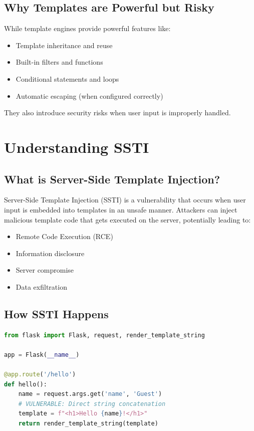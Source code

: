 \documentclass{article}
\begin{document}
\subsection{Why Templates are Powerful but Risky}
While template engines provide powerful features like:
\begin{itemize}
    \item Template inheritance and reuse
    \item Built-in filters and functions
    \item Conditional statements and loops
    \item Automatic escaping (when configured correctly)
\end{itemize}

They also introduce security risks when user input is improperly handled.

\section{Understanding SSTI}

\subsection{What is Server-Side Template Injection?}
Server-Side Template Injection (SSTI) is a vulnerability that occurs when user input is embedded into templates in an unsafe manner. Attackers can inject malicious template code that gets executed on the server, potentially leading to:
\begin{itemize}
    \item Remote Code Execution (RCE)
    \item Information disclosure
    \item Server compromise
    \item Data exfiltration
\end{itemize}

\subsection{How SSTI Happens}
\begin{lstlisting}[language=Python, caption=Vulnerable Code Example]
from flask import Flask, request, render_template_string

app = Flask(__name__)

@app.route('/hello')
def hello():
    name = request.args.get('name', 'Guest')
    # VULNERABLE: Direct string concatenation
    template = f"<h1>Hello {name}!</h1>"
    return render_template_string(template)
\end{lstlisting}
\end{document}
